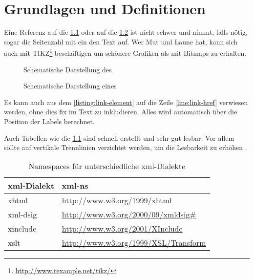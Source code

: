 
\chapter{Grundlagen und Definitionen}
\label{chap:GrundlagenDefinitionen}
\blindtext

Eine Referenz auf die \cref{fig:wot} oder auf die \cref{fig:ht} ist nicht schwer und nimmt, falls nötig, sogar die Seitenzahl mit ein den Text auf. Wer Mut und
Laune hat, kann sich auch mit TIKZ\footnote{\url{http://www.texample.net/tikz/}} beschäftigen um schönere Grafiken als mit Bitmaps zu erhalten.

\begin{figure}
\centering

\caption{Schematische Darstellung des }
\label{fig:wot}
\end{figure}

\begin{figure}
\centering

\caption{Schematische Darstellung eines }
\label{fig:ht}
\end{figure}

Es kann auch aus dem \cref{listing:link-element} auf die Zeile \ref{line:link-href} verwiesen werden, ohne dies fix im Text zu inkludieren. Alles wird automatisch über die
Position der Labels berechnet.



Auch Tabellen wie die \cref{tab:xml-namespaces} sind schnell erstellt und sehr gut lesbar. Vor allem sollte auf vertikale Trennlinien verzichtet werden, um die
Lesbarkeit zu erhöhen \cite{latex}.

\begin{table}
    \centering
    \begin{tabularx}{\textwidth}{ l X }
        \gls{xml}-Dialekt  & \gls{xml-ns} \\
        \hline
        \hline
        \gls{xhtml} & \url{http://www.w3.org/1999/xhtml} \\
        \hline
        \gls{xml-dsig} & \url{http://www.w3.org/2000/09/xmldsig\#} \\
        \hline
        \gls{xinclude} & \url{http://www.w3.org/2001/XInclude} \\
        \hline
        \gls{xslt} & \url{http://www.w3.org/1999/XSL/Transform} \\
        \hline
    \end{tabularx}
    \caption{Namespaces für unterschiedliche \protect\gls{xml}-Dialekte}
    \label{tab:xml-namespaces}
\end{table}

